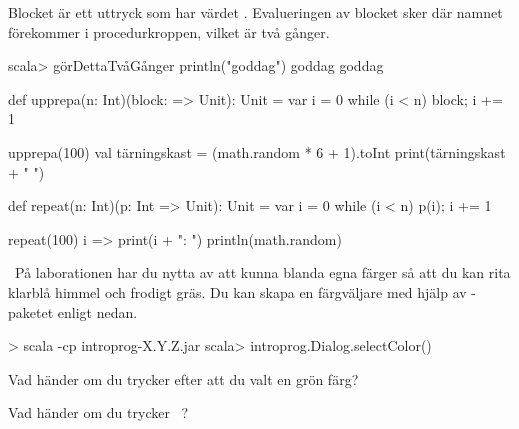 \SOLUTION

\TaskSolved \what

\SubtaskSolved Blocket är ett uttryck som har värdet . Evalueringen av blocket sker där namnet  förekommer i procedurkroppen, vilket är två gånger.
\begin{REPL}
scala> görDettaTvåGånger { println("goddag") }
goddag
goddag
\end{REPL}

\SubtaskSolved
\begin{Code}
def upprepa(n: Int)(block: => Unit): Unit = {
   var i = 0
   while (i < n) {block; i += 1}
}
\end{Code}

\SubtaskSolved
\begin{Code}
upprepa(100){
  val tärningskast = (math.random * 6 + 1).toInt
  print(tärningskast + " ")
}
\end{Code}


\SubtaskSolved
\begin{Code}
def repeat(n: Int)(p: Int => Unit): Unit = {
   var i = 0
   while (i < n) {p(i); i += 1}
}
\end{Code}

\SubtaskSolved
\begin{Code}
repeat(100){ i =>
  print(i + ": ")
  println(math.random)
}
\end{Code}



\QUESTEND




\QUESTBEGIN

\Task \what~På laborationen har du nytta av att kunna blanda egna färger så att du kan rita klarblå himmel och frodigt gräs. Du kan skapa en färgväljare med hjälp av -paketet enligt nedan.
\begin{REPL}
> scala -cp introprog-X.Y.Z.jar
scala> introprog.Dialog.selectColor()
\end{REPL}

\Subtask Vad händer om du trycker  efter att du valt en grön färg?

\Subtask Vad händer om du trycker ~?

